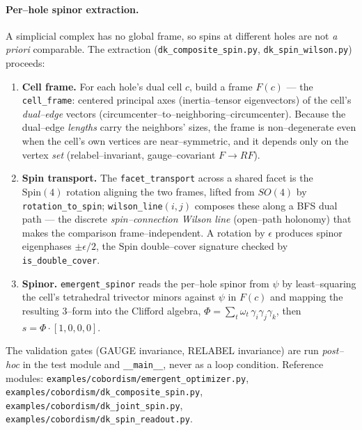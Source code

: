 \documentclass[11pt,oneside]{article}
\newcommand{\code}[1]{\texttt{#1}}
\begin{document}
\paragraph{Per--hole spinor extraction.}
A simplicial complex has no global frame, so spins at different holes are not
\emph{a priori} comparable. The extraction
(\code{dk\_composite\_spin.py}, \code{dk\_spin\_wilson.py}) proceeds:
\begin{enumerate}[leftmargin=1.8em]
  \item \textbf{Cell frame.} For each hole's dual cell $c$, build a frame $F(c)$
        --- the \code{cell\_frame}: centered principal axes (inertia--tensor
        eigenvectors) of the cell's \emph{dual--edge} vectors
        (circumcenter--to--neighboring--circumcenter). Because the dual--edge
        \emph{lengths} carry the neighbors' sizes, the frame is non--degenerate
        even when the cell's own vertices are near--symmetric, and it depends
        only on the vertex \emph{set} (relabel--invariant, gauge--covariant
        $F\to RF$).
  \item \textbf{Spin transport.} The \code{facet\_transport} across a shared
        facet is the $\mathrm{Spin}(4)$ rotation aligning the two frames, lifted
        from $SO(4)$ by \code{rotation\_to\_spin}; \code{wilson\_line}$(i,j)$
        composes these along a BFS dual path --- the discrete
        \emph{spin--connection Wilson line} (open--path holonomy) that makes the
        comparison frame--independent. A rotation by $\epsilon$ produces spinor
        eigenphases $\pm\epsilon/2$, the $\mathrm{Spin}$ double--cover signature
        checked by \code{is\_double\_cover}.
  \item \textbf{Spinor.} \code{emergent\_spinor} reads the per--hole spinor from
        $\psi$ by least--squaring the cell's tetrahedral trivector minors against
        $\psi$ in $F(c)$ and mapping the resulting $3$--form into the Clifford
        algebra, $\Phi=\sum_t\omega_t\,\gamma_i\gamma_j\gamma_k$, then
        $s=\Phi\cdot[1,0,0,0]$.
\end{enumerate}
The validation gates (GAUGE invariance, RELABEL invariance) are run
\emph{post--hoc} in the test module and \code{\_\_main\_\_}, never as a loop
condition. Reference modules:
\code{examples/cobordism/emergent\_optimizer.py},
\code{examples/cobordism/dk\_composite\_spin.py},
\code{examples/cobordism/dk\_joint\_spin.py},
\code{examples/cobordism/dk\_spin\_readout.py}.

\end{document}
